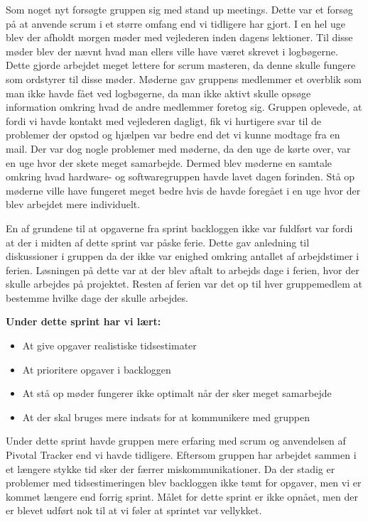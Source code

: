 	Som noget nyt forsøgte gruppen sig med stand up meetings. Dette var et forsøg på at anvende scrum i et større omfang end vi tidligere har gjort. I en hel uge blev der afholdt morgen møder med vejlederen inden dagens lektioner. Til disse møder blev der nævnt hvad man ellers ville have været skrevet i logbøgerne. Dette gjorde arbejdet meget lettere for scrum masteren, da denne skulle fungere som ordstyrer til disse møder. Møderne gav gruppens medlemmer et overblik som man ikke havde fået ved logbøgerne, da man ikke aktivt skulle opsøge information omkring hvad de andre medlemmer foretog sig. Gruppen oplevede, at fordi vi havde kontakt med vejlederen dagligt, fik vi hurtigere svar til de problemer der opstod og hjælpen var bedre end det vi kunne modtage fra en mail. Der var dog nogle problemer med møderne, da den uge de kørte over, var en uge hvor der skete meget samarbejde. Dermed blev møderne en samtale omkring hvad hardware- og softwaregruppen havde lavet dagen forinden. Stå op møderne ville have fungeret meget bedre hvis de havde foregået i en uge hvor der blev arbejdet mere individuelt. \newline
	
	En af grundene til at opgaverne fra sprint backloggen ikke var fuldført var fordi at der i midten af dette sprint var påske ferie. Dette gav anledning til diskussioner i gruppen da der ikke var enighed omkring antallet af arbejdstimer i ferien. Løsningen på dette var at der blev aftalt to arbejds dage i ferien, hvor der skulle arbejdes på projektet. Resten af ferien var det op til hver gruppemedlem at bestemme hvilke dage der skulle arbejdes. \newline
	
	\textbf{Under dette sprint har vi lært:}
	\begin{itemize}
		\item At give opgaver realistiske tidsestimater
		\item At prioritere opgaver i backloggen
		\item At stå op møder fungerer ikke optimalt når der sker meget samarbejde
		\item At der skal bruges mere indsats for at kommunikere med gruppen 
	\end{itemize}
	
	Under dette sprint havde gruppen mere erfaring med scrum og anvendelsen af Pivotal Tracker end vi havde tidligere. Eftersom gruppen har arbejdet sammen i et længere stykke tid sker der færrer miskommunikationer. Da der stadig er problemer med tidsestimeringen blev backloggen ikke tømt for opgaver, men vi er kommet længere end forrig sprint. Målet for dette sprint er ikke opnået, men der er blevet udført nok til at vi føler at sprintet var vellykket.
	
